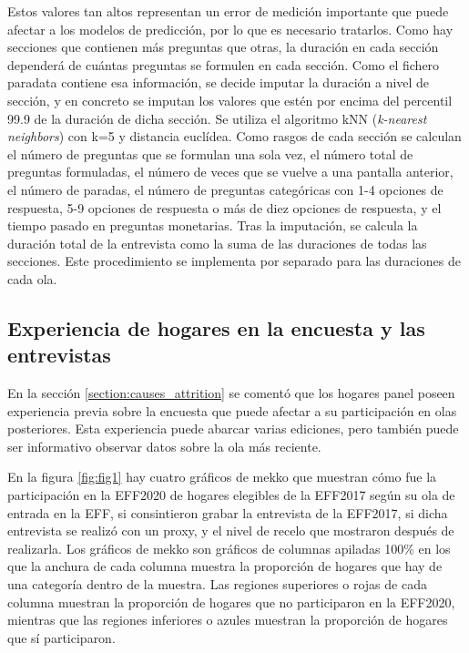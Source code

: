 Estos valores tan altos representan un error de medición importante que puede afectar a los modelos de predicción, por lo que es necesario tratarlos. Como hay secciones que contienen más preguntas que otras, la duración en cada sección dependerá de cuántas preguntas se formulen en cada sección. Como el fichero paradata contiene esa información, se decide imputar la duración a nivel de sección, y en concreto se imputan los valores que estén por encima del percentil 99.9 de la duración de dicha sección. Se utiliza el algoritmo kNN (\textit{k-nearest neighbors}) con k=5 y distancia euclídea. Como rasgos de cada sección se calculan el número de preguntas que se formulan una sola vez, el número total de preguntas formuladas, el número de veces que se vuelve a una pantalla anterior, el número de paradas, el número de preguntas categóricas con 1-4 opciones de respuesta, 5-9 opciones de respuesta o más de diez opciones de respuesta, y el tiempo pasado en preguntas monetarias. Tras la imputación, se calcula la duración total de la entrevista como la suma de las duraciones de todas las secciones. Este procedimiento se implementa por separado para las duraciones de cada ola.

\subsection*{Experiencia de hogares en la encuesta y las entrevistas}

En la sección \ref{section:causes_attrition} se comentó que los hogares panel poseen experiencia previa sobre la encuesta que puede afectar a su participación en olas posteriores. Esta experiencia puede abarcar varias ediciones, pero también puede ser informativo observar datos sobre la ola más reciente.

En la figura \ref{fig:fig1} hay cuatro gráficos de mekko que muestran cómo fue la participación en la EFF2020 de hogares elegibles de la EFF2017 según su ola de entrada en la EFF, si consintieron grabar la entrevista de la EFF2017, si dicha entrevista se realizó con un proxy, y el nivel de recelo que mostraron después de realizarla. Los gráficos de mekko son gráficos de columnas apiladas 100\% en los que la anchura de cada columna muestra la proporción de hogares que hay de una categoría dentro de la muestra. Las regiones superiores o rojas de cada columna muestran la proporción de hogares que no participaron en la EFF2020, mientras que las regiones inferiores o azules muestran la proporción de hogares que sí participaron.

